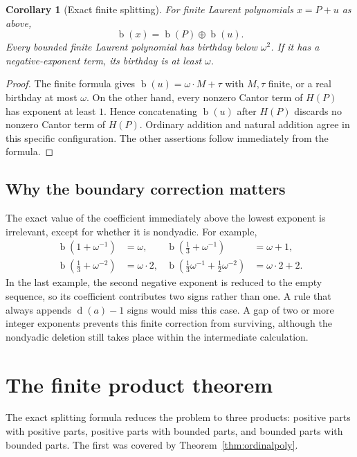\documentclass[11pt,letterpaper]{article}
\numberwithin{equation}{section}
\newtheorem{corollary}[theorem]{Corollary}
\theoremstyle{definition}
\theoremstyle{remark}
\newcommand{\bd}{\operatorname{b}}
\newcommand{\rd}{\operatorname{d}}
\newcommand{\ns}{\mathbin{\oplus}}
\begin{document}
\begin{corollary}[Exact finite splitting]\label{cor:split}
For finite Laurent polynomials $x=P+u$ as above,
\begin{equation}\label{eq:split}
 \bd(x)=\bd(P)\ns\bd(u).
\end{equation}
Every bounded finite Laurent polynomial has birthday below $\omega^2$. If it
has a negative-exponent term, its birthday is at least $\omega$.
\end{corollary}
\begin{proof}
The finite formula gives $\bd(u)=\omega\cdot M+\tau$ with $M,\tau$ finite,
or a real birthday at most $\omega$. On the other hand, every nonzero Cantor
term of $H(P)$ has exponent at least $1$. Hence concatenating $\bd(u)$ after
$H(P)$ discards no nonzero Cantor term of $H(P)$. Ordinary addition and natural
addition agree in this specific configuration. The other assertions follow
immediately from the formula.
\end{proof}

\subsection{Why the boundary correction matters}
The exact value of the coefficient immediately above the lowest exponent is
irrelevant, except for whether it is nondyadic. For example,
\begin{align*}
 \bd(1+\omega^{-1})&=\omega,&
 \bd(\tfrac13+\omega^{-1})&=\omega+1,\\
 \bd(\tfrac13+\omega^{-2})&=\omega\cdot2,&
 \bd(\tfrac13\omega^{-1}+\tfrac12\omega^{-2})
 &=\omega\cdot2+2.
\end{align*}
In the last example, the second negative exponent is reduced to the empty
sequence, so its coefficient contributes two signs rather than one. A rule
that always appends $\rd(a)-1$ signs would miss this case. A gap of two or more
integer exponents prevents this finite correction from surviving, although
the nondyadic deletion still takes place within the intermediate calculation.

\section{The finite product theorem}
\label{sec:finiteproduct}
The exact splitting formula reduces the problem to three products: positive
parts with positive parts, positive parts with bounded parts, and bounded
parts with bounded parts. The first was covered by
Theorem~\ref{thm:ordinalpoly}.
\end{document}
